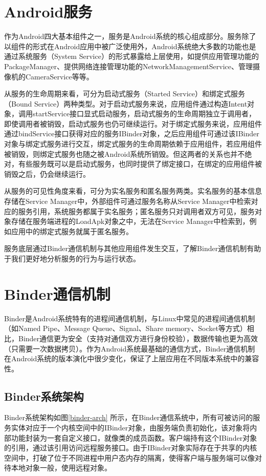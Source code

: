 \documentclass[winfonts,master,twoside]{njuthesis}
\begin{document}
\section{Android服务}

作为Android四大基本组件之一，服务是Android系统的核心组成部分。服务除了以组件的形式在Android应用中被广泛使用外，Android系统绝大多数的功能也是通过系统服务（System Service）的形式暴露给上层使用，如提供应用管理功能的PackageManager、提供网络连接管理功能的NetworkManagementService、管理摄像机的CameraService等等。

从服务的生命周期来看，可分为启动式服务（Started Service）和绑定式服务（Bound Service）两种类型\cite{service}。对于启动式服务来说，应用组件通过构造Intent对象，调用startService接口显式启动服务，启动式服务的生命周期独立于调用者，即使调用者被销毁，启动式服务也仍可继续运行。对于绑定式服务来说，应用组件通过bindService接口获得对应的服务IBinder对象，之后应用组件可通过该IBinder对象与绑定式服务进行交互，绑定式服务的生命周期依赖于应用组件，若应用组件被销毁，则绑定式服务也随之被Android系统所销毁。但这两者的关系也并不绝对，有些服务既可以是启动式服务，也同时提供了绑定接口，在绑定的应用组件被销毁之后，仍会继续运行。

从服务的可见性角度来看，可分为实名服务和匿名服务两类。实名服务的基本信息存储在Service Manager中，外部组件可通过服务名称从Service Manager中检索对应的服务引用，系统服务都属于实名服务；匿名服务只对调用者双方可见，服务对象存储在服务端进程的LoadApk对象之中，无法在Service Manager中检索到，例如应用中的绑定式服务就属于匿名服务。

服务底层通过Binder通信机制与其他应用组件发生交互，了解Binder通信机制有助于我们更好地分析服务的行为与运行状态。


\section{Binder通信机制}

Binder是Android系统特有的进程间通信机制，与Linux中常见的进程间通信机制（如Named Pipe、Message Queue、Signal、Share memory、Socket等方式）相比，Binder通信更为安全（支持对通信双方进行身份校验），数据传输也更为高效（只需要一次数据拷贝）。作为Android系统最基础的通信方式，Binder通信机制在Android系统的版本演化中很少变化，保证了上层应用在不同版本系统中的兼容性。


\subsection{Binder系统架构}

Binder系统架构如图\ref{binder-arch} 所示，在Binder通信系统中，所有可被访问的服务实体对应于一个内核空间中的IBinder对象，由服务端负责初始化，该对象将内部功能封装为一套自定义接口，就像类的成员函数。客户端持有这个IBinder对象的引用，通过该引用访问远程服务接口。由于IBinder对象实际存在于共享的内核空间中，打破了位于不同进程中用户态内存的隔离，使得客户端与服务端可以像对待本地对象一般，使用远程对象。
\end{document}

